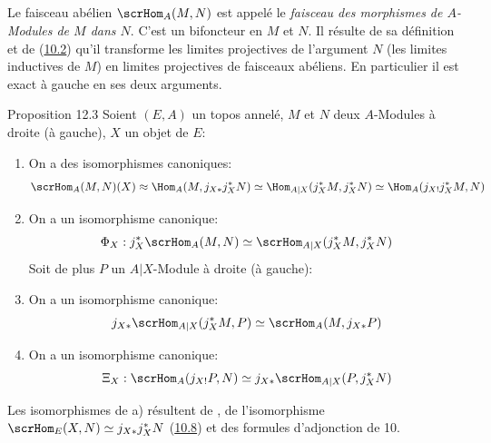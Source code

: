 \documentclass[10pt]{../fichiers-configuration-latex/smfart}
\begin{document}
\setcounter{subsection}{1}
\subsection{}
Le faisceau abélien $\scrHom_A(M,N)$ est appelé le \emph{faisceau
des morphismes de $A$-Modules de $M$ dans $N$}. C'est un bifoncteur
en $M$ et $N$. Il résulte de sa définition et de
(\hyperref[IV.subsec10.2]{10.2}) qu'il transforme les limites projectives de
l'argument $N$ (\resp les limites inductives de $M$) en limites
projectives de faisceaux abéliens. En particulier il est exact à
gauche en ses deux arguments.

\begin{enonce*}{Proposition 12.3}
Soient $(E,A)$ un topos annelé, $M$ et $N$ deux $A$-Modules à droite
(\resp à gauche), $X$ un objet de $E$:
\begin{enumerate}
\renewcommand{\theenumi}{\alph{enumi}}
\renewcommand{\labelenumi}{\theenumi)}
\item On a des isomorphismes canoniques:
$$
\scrHom_A(M,N)(X)\approx \Hom_A(M, j_{X\ast}j^{\ast}_XN)\simeq
\Hom_{A| X}(j^{\ast}_XM, j^{\ast}_XN)\simeq
\Hom_A(j_{X!}j^{\ast}_XM, N)
$$

\item On a un isomorphisme canonique:
$$
\Phi_X:j^{\ast}_X\scrHom_A (M,N)\simeq \scrHom_{A| X}(j^{\ast}_X M,
j^{\ast}_XN)
$$
Soit de plus $P$ un $A| X$-Module à droite (\resp à gauche):

\item On a un isomorphisme canonique:
$$
j_{X\ast}\scrHom_{A| X}(j^{\ast}_X M,P)\simeq
\scrHom_A(M,j_{X\ast}P)
$$

\item On a un isomorphisme canonique:
$$
\Xi_X:\scrHom_A (j_{X!}P,N)\simeq j_{X\ast}\scrHom_{A|
X}(P,j^{\ast}_XN)
$$
\end{enumerate}
\end{enonce*}

\noindent Les isomorphismes de a) résultent de , de
l'isomorphisme $\scrHom_E(X,N)\simeq j_{X\ast}j^{\ast}_XN$
(\hyperref[IV.cor10.8]{10.8}) et des formules d'adjonction de 10.
\end{document}
